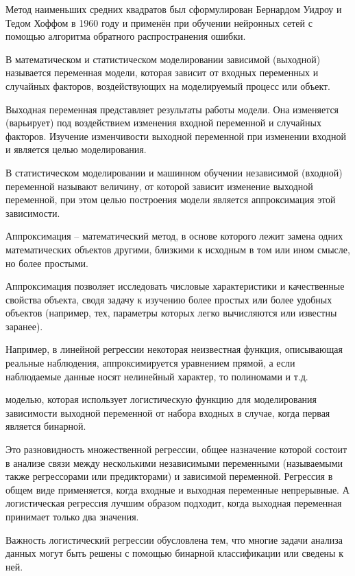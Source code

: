 Метод наименьших средних квадратов был сформулирован Бернардом Уидроу и Тедом Хоффом в 1960 году и применён при
обучении нейронных сетей с помощью алгоритма обратного распространения ошибки.

В математическом и статистическом моделировании зависимой (выходной) называется переменная модели, которая зависит от входных
переменных и случайных факторов, воздействующих на моделируемый процесс или объект.

Выходная переменная представляет результаты работы модели. Она изменяется (варьирует) под воздействием изменения
входной переменной и случайных факторов. Изучение изменчивости выходной переменной при изменении входной и является
целью моделирования.

В статистическом моделировании и машинном обучении независимой (входной) переменной называют величину, от которой зависит
изменение выходной переменной, при этом целью построения модели является аппроксимация этой зависимости.

Аппроксимация -- математический метод, в основе которого лежит замена одних математических объектов другими, близкими к
исходным в том или ином смысле, но более простыми.~\cite{approximation}

Аппроксимация позволяет исследовать числовые характеристики и качественные свойства объекта, сводя задачу к изучению
более простых или более удобных объектов (например, тех, параметры которых легко вычисляются или известны заранее).

Например, в линейной регрессии некоторая неизвестная функция, описывающая реальные наблюдения, аппроксимируется
уравнением прямой, а если наблюдаемые данные носят нелинейный характер, то полиномами и т.д.

моделью, которая использует логистическую функцию для моделирования зависимости выходной переменной от набора входных
в случае, когда первая является бинарной.

Это разновидность множественной регрессии, общее назначение которой состоит в анализе связи между несколькими
независимыми переменными (называемыми также регрессорами или предикторами) и зависимой переменной. Регрессия в общем
виде применяется, когда входные и выходная переменные непрерывные. А логистическая регрессия лучшим образом подходит,
когда выходная переменная принимает только два значения.

Важность логистический регрессии обусловлена тем, что многие задачи анализа данных могут быть решены с помощью бинарной
классификации или сведены к ней.

